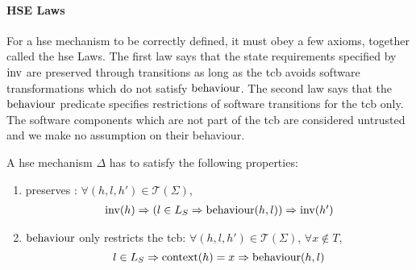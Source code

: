 \paragraph{HSE Laws}
%
For a \ac{hse} mechanism to be correctly defined, it must obey a few axioms,
together called the \ac{hse} Laws.
%
The first law says that the state requirements specified by $\mathrm{inv}$ are
preserved through transitions as long as the \ac{tcb} avoids software
transformations which do not satisfy $\mathrm{behaviour}$.
%
The second law says that the $\mathrm{behaviour}$ predicate specifies restrictions
of software transitions for the \ac{tcb} only.
%
The software components which are not part of the \ac{tcb} are considered
untrusted and we make no assumption on their behaviour.

\begin{definition}
  \label{def:laws}
  A \ac{hse} mechanism $\Delta$ has to satisfy the following properties:
  \begin{enumerate}
  \item {} preserves :
    $\forall (h, l, h') \in \mathcal{T}(\Sigma)$,
    \[
      \begin{array}{l} \mathrm{inv}(h) \Rightarrow (l \in L_S \Rightarrow
        \mathrm{behaviour}(h,l)) \Rightarrow \mathrm{inv}(h')
      \end{array}
    \]
  \item $\mathrm{behaviour}$ only restricts the \ac{tcb}:
    $\forall (h, l, h') \in \mathcal{T}(\Sigma)$, $\forall x \not\in T$,
    \[
      l \in L_S \Rightarrow \mathrm{context}(h) = x \Rightarrow
      \mathrm{behaviour}(h, l)
    \]
  \end{enumerate}
\end{definition}

